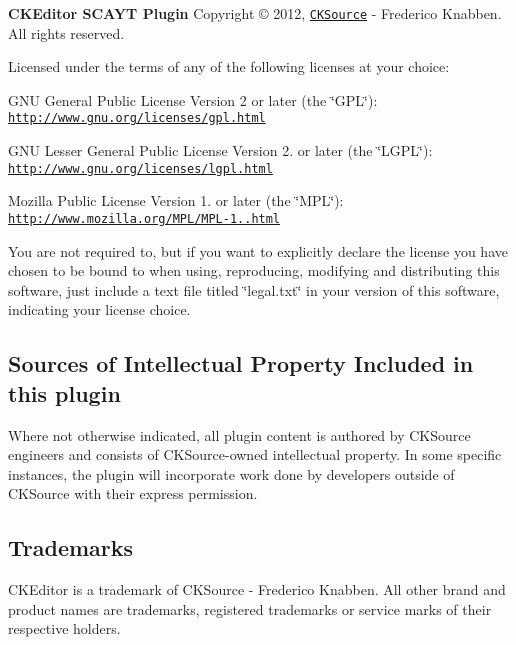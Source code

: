 {\bfseries C\+K\+Editor S\+C\+A\+YT Plugin} Copyright \copyright{} 2012, \href{http://cksource.com}{\tt C\+K\+Source} -\/ Frederico Knabben. All rights reserved.

Licensed under the terms of any of the following licenses at your choice\+:


\begin{DoxyItemize}
\item G\+NU General Public License Version 2 or later (the \char`\"{}\+G\+P\+L\char`\"{})\+: \href{http://www.gnu.org/licenses/gpl.html}{\tt http\+://www.\+gnu.\+org/licenses/gpl.\+html}
\item G\+NU Lesser General Public License Version 2. or later (the \char`\"{}\+L\+G\+P\+L\char`\"{})\+: \href{http://www.gnu.org/licenses/lgpl.html}{\tt http\+://www.\+gnu.\+org/licenses/lgpl.\+html}
\item Mozilla Public License Version 1. or later (the \char`\"{}\+M\+P\+L\char`\"{})\+: \href{http://www.mozilla.org/MPL/MPL-1.1.html}{\tt http\+://www.\+mozilla.\+org/\+M\+P\+L/\+M\+P\+L-\/1..\+html}
\end{DoxyItemize}

You are not required to, but if you want to explicitly declare the license you have chosen to be bound to when using, reproducing, modifying and distributing this software, just include a text file titled \char`\"{}legal.\+txt\char`\"{} in your version of this software, indicating your license choice.

\subsection*{Sources of Intellectual Property Included in this plugin }

Where not otherwise indicated, all plugin content is authored by C\+K\+Source engineers and consists of C\+K\+Source-\/owned intellectual property. In some specific instances, the plugin will incorporate work done by developers outside of C\+K\+Source with their express permission.

\subsection*{Trademarks }

C\+K\+Editor is a trademark of C\+K\+Source -\/ Frederico Knabben. All other brand and product names are trademarks, registered trademarks or service marks of their respective holders. 